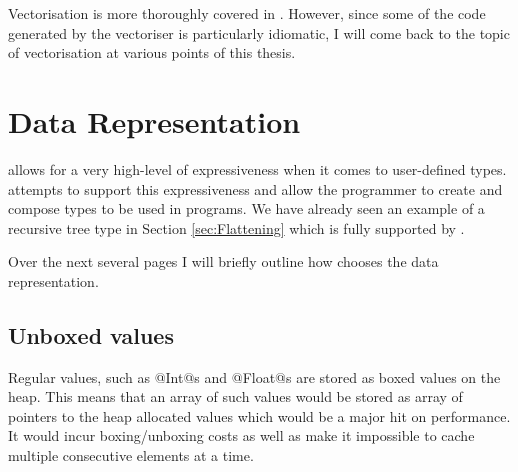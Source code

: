 \documentclass[preamble.tex]{subfiles}
\begin{document}



Vectorisation is more thoroughly covered in \cite{PLKC08}. However, since some of the code generated by the vectoriser is particularly idiomatic, I will come back to the topic of vectorisation at various points of this thesis.



\clearpage

\section{Data Representation}
\label{sec:DPH-Data-Representation}

\Haskell allows for a very high-level of expressiveness when it comes to user-defined types. \DPH attempts to support this expressiveness and allow the programmer to create and compose types to be used in \DPH programs. We have already seen an example of a recursive tree type in Section \ref{sec:Flattening} which is fully supported by \DPH.

Over the next several pages I will briefly outline how \DPH chooses the data representation.


\subsection{Unboxed values}
\iboxing

Regular \Haskell values, such as @Int@s and @Float@s are stored as boxed values on the heap. This means that an array of such values would be stored as array of pointers to the heap allocated values which would be a major hit on performance. It would incur boxing/unboxing costs as well as make it impossible to cache multiple consecutive elements at a time.
\end{document}
